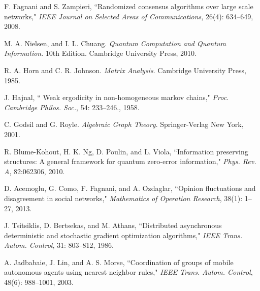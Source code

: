 \documentclass[a4paper, 11pt]{article}
\begin{document}
\begin{thebibliography}{99}
 F. Fagnani and S. Zampieri, ``Randomized consensus algorithms over large scale networks,"
{\em IEEE Journal on Selected Areas of Communications}, 26(4): 634--649, 2008.


 M. A. Nielsen, and  I. L. Chuang. {\em Quantum Computation and Quantum Information}. 10th Edition. Cambridge University Press, 2010.

 R. A. Horn  and C. R. Johnson.  {\em Matrix Analysis}. Cambridge University Press, 1985.

 J. Hajnal, `` Weak ergodicity in non-homogeneous markov chains," {\em Proc. Cambridge
Philos. Soc.}, 54:  233--246., 1958.

 C. Godsil  and G. Royle. {\em Algebraic Graph Theory}. Springer-Verlag New York, 2001.


 R. Blume-Kohout, H. K. Ng, D.  Poulin, and L.  Viola, ``Information preserving structures: A general framework for quantum zero-error information," {\em Phys. Rev. A},  82:062306, 2010.


 D. Acemoglu, G.   Como, F.   Fagnani,  and  A. Ozdaglar, ``Opinion fluctuations and disagreement in social networks,"  {\em Mathematics of Operation Research}, 38(1): 1--27, 2013.


J. Tsitsiklis, D. Bertsekas, and M. Athans, ``Distributed asynchronous
deterministic and stochastic gradient optimization algorithms," {\em IEEE Trans. Autom. Control}, 31: 803--812, 1986.



A. Jadbabaie, J. Lin, and A. S. Morse, ``Coordination of groups of mobile autonomous agents using nearest neighbor rules,"  {\em IEEE Trans.  Autom. Control},  48(6): 988--1001, 2003.







\end{thebibliography}
\end{document}
